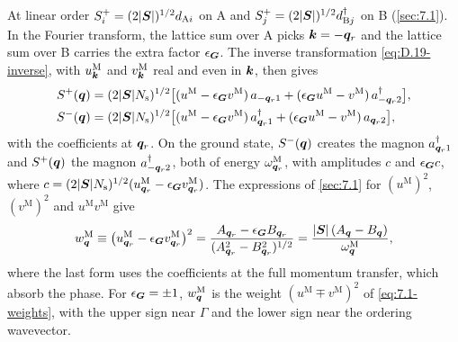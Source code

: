At linear order $S^+_i = (2|\bm{S}|)^{1/2}d_{\mathrm{A}i}$ on A and $S^+_j = (2|\bm{S}|)^{1/2}d^\dagger_{\mathrm{B}j}$ on B (\cref{sec:7.1}). In the Fourier transform, the lattice sum over A picks $\bm{k} = -\bm{q}_r$ and the lattice sum over B carries the extra factor $\epsilon_{\bm{G}}$. The inverse transformation \cref{eq:D.19-inverse}, with $u^{\mathrm{M}}_{\bm{k}}$ and $v^{\mathrm{M}}_{\bm{k}}$ real and even in $\bm{k}$, then gives
\begin{equation*}
  \begin{aligned}
  S^+(\bm{q}) &= (2|\bm{S}|N_{\mathrm{s}})^{1/2}\bigl[(u^{\mathrm{M}} - \epsilon_{\bm{G}}v^{\mathrm{M}})\,a_{-\bm{q}_r1} + (\epsilon_{\bm{G}}u^{\mathrm{M}} - v^{\mathrm{M}})\,a^\dagger_{-\bm{q}_r2}\bigr] , \\
  S^-(\bm{q}) &= (2|\bm{S}|N_{\mathrm{s}})^{1/2}\bigl[(u^{\mathrm{M}} - \epsilon_{\bm{G}}v^{\mathrm{M}})\,a^\dagger_{\bm{q}_r1} + (\epsilon_{\bm{G}}u^{\mathrm{M}} - v^{\mathrm{M}})\,a_{\bm{q}_r2}\bigr] ,
  \end{aligned}
\end{equation*}
with the coefficients at $\bm{q}_r$. On the ground state, $S^-(\bm{q})$ creates the magnon $a^\dagger_{\bm{q}_r1}$ and $S^+(\bm{q})$ the magnon $a^\dagger_{-\bm{q}_r2}$, both of energy $\omega^{\mathrm{M}}_{\bm{q}_r}$, with amplitudes $c$ and $\epsilon_{\bm{G}}c$, where $c = (2|\bm{S}|N_{\mathrm{s}})^{1/2}(u^{\mathrm{M}}_{\bm{q}_r} - \epsilon_{\bm{G}}v^{\mathrm{M}}_{\bm{q}_r})$. The expressions of \cref{sec:7.1} for $(u^{\mathrm{M}})^2$, $(v^{\mathrm{M}})^2$ and $u^{\mathrm{M}}v^{\mathrm{M}}$ give
\begin{equation}
  w^{\mathrm{M}}_{\bm{q}} \equiv \bigl(u^{\mathrm{M}}_{\bm{q}_r} - \epsilon_{\bm{G}}v^{\mathrm{M}}_{\bm{q}_r}\bigr)^2
  = \frac{A_{\bm{q}_r} - \epsilon_{\bm{G}}B_{\bm{q}_r}}{(A_{\bm{q}_r}^2 - B_{\bm{q}_r}^2)^{1/2}}
  = \frac{|\bm{S}|\,(A_{\bm{q}} - B_{\bm{q}})}{\omega^{\mathrm{M}}_{\bm{q}}} ,
  \label{eq:D.38-weight}
\end{equation}
where the last form uses the coefficients at the full momentum transfer, which absorb the phase. For $\epsilon_{\bm{G}} = \pm1$, $w^{\mathrm{M}}_{\bm{q}}$ is the weight $(u^{\mathrm{M}} \mp v^{\mathrm{M}})^2$ of \cref{eq:7.1-weights}, with the upper sign near $\Gamma$ and the lower sign near the ordering wavevector.

